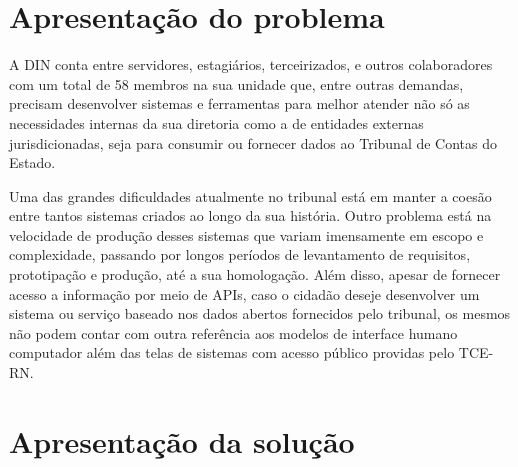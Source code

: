 \section{Apresentação do problema }

A DIN conta entre servidores, estagiários, terceirizados, e outros colaboradores com um total de 58 membros na sua unidade \cite{relatorio_trimestral} que, entre outras demandas, precisam desenvolver sistemas e ferramentas para melhor atender não só as necessidades internas da sua diretoria como a de entidades externas jurisdicionadas, seja para consumir ou fornecer dados ao Tribunal de Contas do Estado.

Uma das grandes dificuldades atualmente no tribunal está em manter a coesão entre tantos sistemas criados ao longo da sua história. Outro problema está na velocidade de produção desses sistemas que variam imensamente em escopo e complexidade, passando por longos períodos de levantamento de requisitos, prototipação e produção, até a sua homologação. Além disso, apesar de fornecer acesso a informação por meio de APIs, caso o cidadão deseje desenvolver um sistema ou serviço baseado nos dados abertos fornecidos pelo tribunal, os mesmos não podem contar com outra referência aos modelos de interface humano computador além das telas de sistemas com acesso público providas pelo TCE-RN.



\section{Apresentação da solução }

